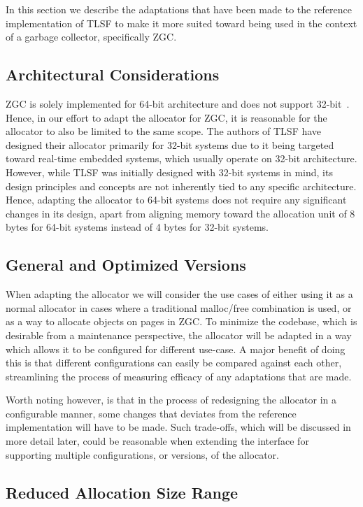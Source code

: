 
In this section we describe the adaptations that have been made to the reference implementation of TLSF to make it more suited toward being used in the context of a garbage collector, specifically ZGC.

\subsection{Architectural Considerations}

ZGC is solely implemented for 64-bit architecture and does not support 32-bit~\cite{zgc_deep_dive}. Hence, in our effort to adapt the allocator for ZGC, it is reasonable for the allocator to also be limited to the same scope. The authors of TLSF have designed their allocator primarily for 32-bit systems due to it being targeted toward real-time embedded systems, which usually operate on 32-bit architecture. However, while TLSF was initially designed with 32-bit systems in mind, its design principles and concepts are not inherently tied to any specific architecture. Hence, adapting the allocator to 64-bit systems does not require any significant changes in its design, apart from aligning memory toward the allocation unit of 8 bytes for 64-bit systems instead of 4 bytes for 32-bit systems.

\subsection{General and Optimized Versions}

When adapting the allocator we will consider the use cases of either using it as a normal allocator in cases where a traditional malloc/free combination is used, or as a way to allocate objects on pages in ZGC. To minimize the codebase, which is desirable from a maintenance perspective, the allocator will be adapted in a way which allows it to be configured for different use-case. A major benefit of doing this is that different configurations can easily be compared against each other, streamlining the process of measuring efficacy of any adaptations that are made.

Worth noting however, is that in the process of redesigning the allocator in a configurable manner, some changes that deviates from the reference implementation will have to be made. Such trade-offs, which will be discussed in more detail later, could be reasonable when extending the interface for supporting multiple configurations, or versions, of the allocator.

\subsection{Reduced Allocation Size Range}

